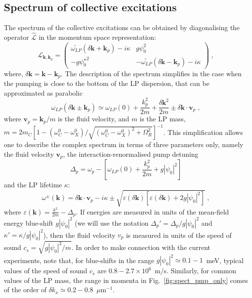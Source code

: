 
\subsection{Spectrum of collective excitations}
\label{sec:spect}
%
The spectrum of the collective excitations can be obtained by
diagonalising the operator $\hat{\mathcal{L}}$ in the momentum space
representation:
%
\begin{equation}
  \mathcal{L}_{\bm{k},\bm{k}_p} = \begin{pmatrix}
    \widetilde{\omega_{LP}} (\delta \bm{k}+\bm{k}_p) - i \kappa &
    g \psi_0^2 \\ -g {\psi_0^{\star}}^2 & -
    \widetilde{\omega_{LP}}(\delta \bm{k}-\bm{k}_p) -
    i\kappa \end{pmatrix}\; ,
\label{eq:opell}
\end{equation}
%
where, $\delta \bm{k} = \bm{k} - \bm{k}_p$. The description of
the spectrum simplifies in the case when the pumping is close to the
bottom of the LP dispersion, that can be approximated as parabolic
%
\begin{equation}
  \omega_{LP} (\delta \bm{k} \pm \bm{k}_p) \simeq \omega_{LP}(0) +
  \frac{k_p^2}{2m} + \frac{\delta \bm{k}^2}{2m} \pm \delta \bm{k}
  \cdot \bm{v}_p \; ,
\end{equation}
%
where $\bm{v}_p=\bm{k}_p/m$ is the fluid velocity, and $m$ is the
LP mass, $m = 2m_C [1 - (\omega_C^0 - \omega_X^0)/\sqrt{(\omega_C^0 -
    \omega_X^0)^2 + \Omega_R^2}]^{-1}$. This simplification allows one
to describe the complex spectrum in terms of three parameters only,
namely the fluid velocity $\bm{v}_p$, the interaction-renormalised
pump detuning
%
\begin{equation}
  \Delta_p = \omega_p - \left[\omega_{LP} (0) +\frac{k_p^2}{2m} +
    g|\psi_0|^2\right]
\end{equation}
%
and the LP lifetime $\kappa$:
%
\begin{equation}
  \omega^{\pm} (\bm{k}) = \delta \bm{k}\cdot \bm{v}_p - i\kappa
  \pm \sqrt{\varepsilon(\delta \bm{k}) \left[\varepsilon(\delta
      \bm{k}) + 2g|\psi_0|^2\right]} \; ,
\label{eq:spect}
\end{equation}
%
where $\varepsilon(\bm{k}) = \frac{k^2}{2m} - \Delta_p$. If energies
are measured in units of the mean-field energy blue-shift $g
|\psi_0|^2$ (we will use the notation $\Delta_p' =
\Delta_p/g|\psi_0|^2$ and $\kappa'= \kappa/g|\psi_0|^2$), then the
fluid velocity $v_p$ is measured in units of the speed of sound $c_s =
\sqrt{g|\psi_0|^2/m}$. In order to make connection with the current
experiments, note that, for blue-shifts in the range $g |\psi_0|^2
\simeq 0.1-1$~meV, typical values of the speed of sound $c_s$ are
$0.8-2.7\times 10^6$~m/s. Similarly, for common values of the LP mass,
the range in momenta in Fig.~\ref{fig:spect_pmp_only} comes of the order of
$\delta k_x \simeq 0.2-0.8$~$\mu$m${}^{-1}$.

